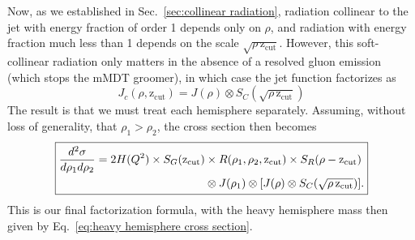 \documentclass[12pt,twoside,class=../reedthesis, crop=false]{standalone}
\providecommand{\zcut}{\mathrm{z_{cut}}}
\begin{document}
	Now, as we established in Sec.~\ref{sec:collinear radiation}, radiation collinear to the jet with energy fraction of order 1 depends only on $\rho$, and radiation with energy fraction much less than 1 depends on the scale $\sqrt{\rho\,\zcut}$. However, this soft-collinear radiation only matters in the absence of a resolved gluon emission (which stops the mMDT groomer), in which case the jet function factorizes as
	\begin{equation}
		J_c(\rho, \zcut) = J(\rho) \otimes S_C(\sqrt{\rho\,\zcut})
	\end{equation}
	The result is that we must treat each hemisphere separately. Assuming, without loss of generality, that $\rho_1 > \rho_2$, the cross section then becomes
	\begin{equation}
	\boxed{
	\begin{aligned}
		\frac{d^2\sigma}{d\rho_1 d\rho_2} = 2 H(Q^2) \times S_G(\zcut) &\times R(\rho_1, \rho_2, \zcut) \times S_R(\rho - \zcut) \\
			&\otimes J(\rho_1) \otimes \qty[J(\rho) \otimes S_C(\sqrt{\rho\,\zcut})].
	\end{aligned}
	}
	\end{equation}
	This is our final factorization formula, with the heavy hemisphere mass then given by Eq.~\ref{eq:heavy hemisphere cross section}.

\ifstandalone
 

\fi
\end{document}
